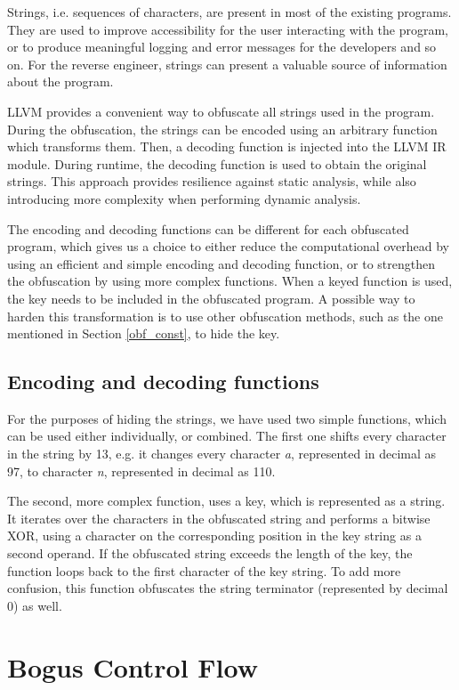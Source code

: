 \documentclass[
  digital, %
  table,   %
  twoside, %
  nolof,     %
  nolot,     %
]{fithesis3}
\theoremstyle{definition}
\begin{document}
Strings, i.e. sequences of characters, are present in most of the existing programs. They are used to improve accessibility for the user interacting with the program, or to produce meaningful logging and error messages for the developers and so on. For the reverse engineer, strings can present a valuable source of information about the program. %

LLVM provides a convenient way to obfuscate all strings used in the program. During the obfuscation, the strings can be encoded using an arbitrary function which transforms them. Then, a decoding function is injected into the LLVM IR module. During runtime, the decoding function is used to obtain the original strings. This approach provides resilience against static analysis, while also introducing more complexity when performing dynamic analysis. 

The encoding and decoding functions can be different for each obfuscated program, which gives us a choice to either reduce the computational overhead by using an efficient and simple encoding and decoding function, or to strengthen the obfuscation by using more complex functions. When a keyed function is used, the key needs to be included in the obfuscated program. A possible way to harden this transformation is to use other obfuscation methods, such as the one mentioned in Section \ref{obf_const}, to hide the key.

\subsection{Encoding and decoding functions}
For the purposes of hiding the strings, we have used two simple functions, which can be used either individually, or combined. The first one shifts every character in the string by 13, e.g. it changes every character \textit{a}, represented in decimal as 97, to character \textit{n}, represented in decimal as 110.

The second, more complex function, uses a key, which is represented as a string. It iterates over the characters in the obfuscated string and performs a bitwise XOR, using a character on the corresponding position in the key string as a second operand. If the obfuscated string exceeds the length of the key, the function loops back to the first character of the key string. To add more confusion, this function obfuscates the string terminator (represented by decimal 0) as well.

\section{Bogus Control Flow} \label{des_bogus}
\end{document}
